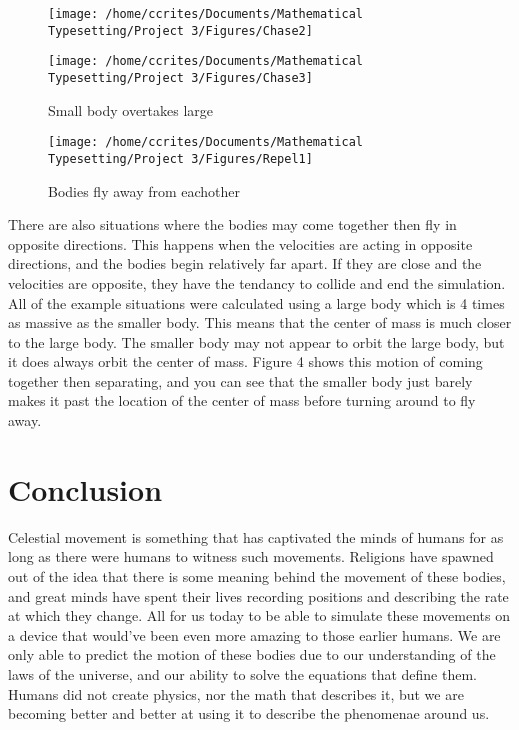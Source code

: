 \documentclass[10pt]{article}
\begin{document}
\pagebreak
\begin{figure}
\begin{minipage}[l]{0.45\linewidth}
\texttt{[image: /home/ccrites/Documents/Mathematical Typesetting/Project 3/Figures/Chase2]}
\end{minipage}%
\begin{minipage}[r]{0.45\linewidth}
\texttt{[image: /home/ccrites/Documents/Mathematical Typesetting/Project 3/Figures/Chase3]}
\caption{\label{fig3} Small body overtakes large}
\end{minipage}
\end{figure}%
\par
\bigskip \bigskip%

\begin{wrapfigure}{r}{0.45\textwidth}
\texttt{[image: /home/ccrites/Documents/Mathematical Typesetting/Project 3/Figures/Repel1]}
\caption{\label{fig4} Bodies fly away from eachother}
\end{wrapfigure}
\par There are also situations where the bodies may come together then fly in opposite directions. This happens when the velocities are acting in opposite directions, and the bodies begin relatively far apart. If they are close and the velocities are opposite, they have the tendancy to collide and end the simulation. All of the example situations were calculated using a large body which is 4 times as massive as the smaller body. This means that the center of mass is much closer to the large body. The smaller body may not appear to orbit the large body, but it does always orbit the center of mass. Figure 4 shows this motion of coming together then separating, and you can see that the smaller body just barely makes it past the location of the center of mass before turning around to fly away.
\section{Conclusion}\label{Sec_Conclusion}
Celestial movement is something that has captivated the minds of humans for as long as there were humans to witness such movements. Religions have spawned out of the idea that there is some meaning behind the movement of these bodies, and great minds have spent their lives recording positions and describing the rate at which they change. All for us today to be able to simulate these movements on a device that would've been even more amazing to those earlier humans. We are only able to predict the motion of these bodies due to our understanding of the laws of the universe, and our ability to solve the equations that define them. Humans did not create physics, nor the math that describes it, but we are becoming better and better at using it to describe the phenomenae around us.
\end{document}
